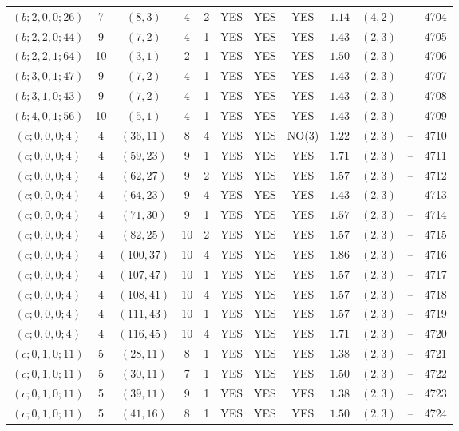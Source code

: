 \begin{longtable}{|c|c|c|c|c|c|c|c|c|c|c|c|}
$(b;2,0,0;26)$ & 7 & $(8,3)$ & 4 & 2 & YES & YES & YES & $1.14$ & $(4,2)$ & -- & 4704\\
$(b;2,2,0;44)$ & 9 & $(7,2)$ & 4 & 1 & YES & YES & YES & $1.43$ & $(2,3)$ & -- & 4705\\
$(b;2,2,1;64)$ & 10 & $(3,1)$ & 2 & 1 & YES & YES & YES & $1.50$ & $(2,3)$ & -- & 4706\\
$(b;3,0,1;47)$ & 9 & $(7,2)$ & 4 & 1 & YES & YES & YES & $1.43$ & $(2,3)$ & -- & 4707\\
$(b;3,1,0;43)$ & 9 & $(7,2)$ & 4 & 1 & YES & YES & YES & $1.43$ & $(2,3)$ & -- & 4708\\
$(b;4,0,1;56)$ & 10 & $(5,1)$ & 4 & 1 & YES & YES & YES & $1.43$ & $(2,3)$ & -- & 4709\\
$(c;0,0,0;4)$ & 4 & $(36,11)$ & 8 & 4 & YES & YES & NO(3) & $1.22$ & $(2,3)$ & -- & 4710\\
$(c;0,0,0;4)$ & 4 & $(59,23)$ & 9 & 1 & YES & YES & YES & $1.71$ & $(2,3)$ & -- & 4711\\
$(c;0,0,0;4)$ & 4 & $(62,27)$ & 9 & 2 & YES & YES & YES & $1.57$ & $(2,3)$ & -- & 4712\\
$(c;0,0,0;4)$ & 4 & $(64,23)$ & 9 & 4 & YES & YES & YES & $1.43$ & $(2,3)$ & -- & 4713\\
$(c;0,0,0;4)$ & 4 & $(71,30)$ & 9 & 1 & YES & YES & YES & $1.57$ & $(2,3)$ & -- & 4714\\
$(c;0,0,0;4)$ & 4 & $(82,25)$ & 10 & 2 & YES & YES & YES & $1.57$ & $(2,3)$ & -- & 4715\\
$(c;0,0,0;4)$ & 4 & $(100,37)$ & 10 & 4 & YES & YES & YES & $1.86$ & $(2,3)$ & -- & 4716\\
$(c;0,0,0;4)$ & 4 & $(107,47)$ & 10 & 1 & YES & YES & YES & $1.57$ & $(2,3)$ & -- & 4717\\
$(c;0,0,0;4)$ & 4 & $(108,41)$ & 10 & 4 & YES & YES & YES & $1.57$ & $(2,3)$ & -- & 4718\\
$(c;0,0,0;4)$ & 4 & $(111,43)$ & 10 & 1 & YES & YES & YES & $1.57$ & $(2,3)$ & -- & 4719\\
$(c;0,0,0;4)$ & 4 & $(116,45)$ & 10 & 4 & YES & YES & YES & $1.71$ & $(2,3)$ & -- & 4720\\
$(c;0,1,0;11)$ & 5 & $(28,11)$ & 8 & 1 & YES & YES & YES & $1.38$ & $(2,3)$ & -- & 4721\\
$(c;0,1,0;11)$ & 5 & $(30,11)$ & 7 & 1 & YES & YES & YES & $1.50$ & $(2,3)$ & -- & 4722\\
$(c;0,1,0;11)$ & 5 & $(39,11)$ & 9 & 1 & YES & YES & YES & $1.38$ & $(2,3)$ & -- & 4723\\
$(c;0,1,0;11)$ & 5 & $(41,16)$ & 8 & 1 & YES & YES & YES & $1.50$ & $(2,3)$ & -- & 4724\\

\end{longtable}
